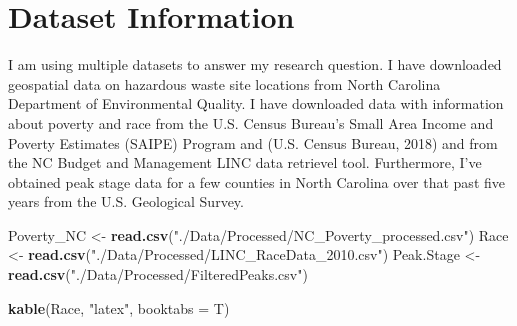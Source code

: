 \documentclass[12pt,]{article}
\newenvironment{Shaded}{\begin{snugshade}}{\end{snugshade}}
\newcommand{\KeywordTok}[1]{\textcolor[rgb]{0.13,0.29,0.53}{\textbf{#1}}}
\newcommand{\DataTypeTok}[1]{\textcolor[rgb]{0.13,0.29,0.53}{#1}}
\newcommand{\StringTok}[1]{\textcolor[rgb]{0.31,0.60,0.02}{#1}}
\newcommand{\NormalTok}[1]{#1}
\begin{document}
\newpage

\section{Dataset Information}\label{dataset-information}

I am using multiple datasets to answer my research question. I have
downloaded geospatial data on hazardous waste site locations from North
Carolina Department of Environmental Quality. I have downloaded data
with information about poverty and race from the U.S. Census Bureau's
Small Area Income and Poverty Estimates (SAIPE) Program and (U.S. Census
Bureau, 2018) and from the NC Budget and Management LINC data retrievel
tool. Furthermore, I've obtained peak stage data for a few counties in
North Carolina over that past five years from the U.S. Geological
Survey.

\begin{Shaded}
\begin{Highlighting}[]
\NormalTok{Poverty_NC <-}\StringTok{ }\KeywordTok{read.csv}\NormalTok{(}\StringTok{"./Data/Processed/NC_Poverty_processed.csv"}\NormalTok{)}
\NormalTok{Race <-}\StringTok{ }\KeywordTok{read.csv}\NormalTok{(}\StringTok{"./Data/Processed/LINC_RaceData_2010.csv"}\NormalTok{)}
\NormalTok{Peak.Stage <-}\StringTok{ }\KeywordTok{read.csv}\NormalTok{(}\StringTok{"./Data/Processed/FilteredPeaks.csv"}\NormalTok{)  }

\KeywordTok{kable}\NormalTok{(Race, }\StringTok{"latex"}\NormalTok{, }\DataTypeTok{booktabs =}\NormalTok{ T) }
\end{Highlighting}
\end{Shaded}
\end{document}
